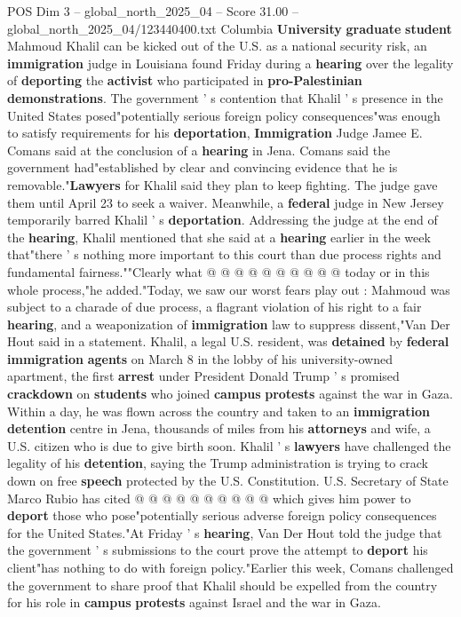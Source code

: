 \begin{textsample}{POS Dim 3 – global\_north\_2025\_04 – Score 31.00 – global\_north\_2025\_04/123440400.txt}  \label{ex:f3_pos_055}
Columbia \textbf{University} \textbf{graduate} \textbf{student} Mahmoud Khalil can be kicked out of the U.S. as a national security risk, an \textbf{immigration} judge in Louisiana found Friday during a \textbf{hearing} over the legality of \textbf{deporting} the \textbf{activist} who participated in \textbf{pro-Palestinian} \textbf{demonstrations}.
The government ' s contention that Khalil ' s presence in the United States posed"potentially serious foreign policy consequences"was enough to satisfy requirements for his \textbf{deportation}, \textbf{Immigration} Judge Jamee E.
Comans said at the conclusion of a \textbf{hearing} in Jena.
Comans said the government had"established by clear and convincing evidence that he is removable."\textbf{Lawyers} for Khalil said they plan to keep fighting.
The judge gave them until April 23 to seek a waiver.
Meanwhile, a \textbf{federal} judge in New Jersey temporarily barred Khalil ' s \textbf{deportation}.
Addressing the judge at the end of the \textbf{hearing}, Khalil mentioned that she said at a \textbf{hearing} earlier in the week that"there ' s nothing more important to this court than due process rights and fundamental fairness.""Clearly what @ @ @ @ @ @ @ @ @ @ today or in this whole process,"he added."Today, we saw our worst fears play out : Mahmoud was subject to a charade of due process, a flagrant violation of his right to a fair \textbf{hearing}, and a weaponization of \textbf{immigration} law to suppress dissent,"Van Der Hout said in a statement.
Khalil, a legal U.S. resident, was \textbf{detained} by \textbf{federal} \textbf{immigration} \textbf{agents} on March 8 in the lobby of his university-owned apartment, the first \textbf{arrest} under President Donald Trump ' s promised \textbf{crackdown} on \textbf{students} who joined \textbf{campus} \textbf{protests} against the war in Gaza.
Within a day, he was flown across the country and taken to an \textbf{immigration} \textbf{detention} centre in Jena, thousands of miles from his \textbf{attorneys} and wife, a U.S. citizen who is due to give birth soon.
Khalil ' s \textbf{lawyers} have challenged the legality of his \textbf{detention}, saying the Trump administration is trying to crack down on free \textbf{speech} protected by the U.S.
Constitution.
U.S.
Secretary of State Marco Rubio has cited @ @ @ @ @ @ @ @ @ @ which gives him power to \textbf{deport} those who pose"potentially serious adverse foreign policy consequences for the United States."At Friday ' s \textbf{hearing}, Van Der Hout told the judge that the government ' s submissions to the court prove the attempt to \textbf{deport} his client"has nothing to do with foreign policy."Earlier this week, Comans challenged the government to share proof that Khalil should be expelled from the country for his role in \textbf{campus} \textbf{protests} against Israel and the war in Gaza.

\end{textsample}
